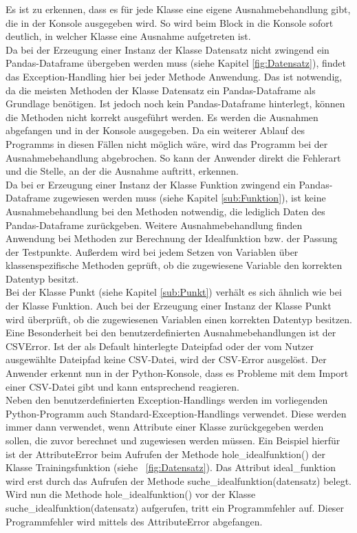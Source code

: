 \documentclass[11pt,a4paper]{scrreprt}
\newcommand{\abbildung}[1]{\figurename\ \ref{#1}}
\begin{document}
Es ist zu erkennen, dass es für jede Klasse eine eigene Ausnahmebehandlung gibt, die in der Konsole ausgegeben wird. So wird beim Block in die Konsole sofort deutlich, in welcher Klasse eine Ausnahme aufgetreten ist.\\
Da bei der Erzeugung einer Instanz der Klasse Datensatz nicht zwingend ein Pandas-Dataframe übergeben werden muss (siehe Kapitel \ref{fig:Datensatz}), findet das Exception-Handling hier bei jeder Methode Anwendung. Das ist notwendig, da die meisten Methoden der Klasse Datensatz ein Pandas-Dataframe als Grundlage benötigen. Ist jedoch noch kein Pandas-Dataframe hinterlegt, können die Methoden nicht korrekt ausgeführt werden. Es werden die Ausnahmen abgefangen und in der Konsole ausgegeben. Da ein weiterer Ablauf des Programms in diesen Fällen nicht möglich wäre, wird das Programm bei der Ausnahmebehandlung abgebrochen. So kann der Anwender direkt die Fehlerart und die Stelle, an der die Ausnahme auftritt, erkennen.\\
Da bei er Erzeugung einer Instanz der Klasse Funktion zwingend ein Pandas-Dataframe zugewiesen werden muss (siehe Kapitel \ref{sub:Funktion}), ist keine Ausnahmebehandlung bei den Methoden notwendig, die lediglich Daten des Pandas-Dataframe zurückgeben. 
Weitere Ausnahmebehandlung finden Anwendung bei Methoden zur Berechnung der Idealfunktion bzw. der Passung der Testpunkte. Außerdem wird bei jedem Setzen von Variablen über klassenspezifische Methoden geprüft, ob die zugewiesene Variable den korrekten Datentyp besitzt.  \\
Bei der Klasse Punkt (siehe Kapitel \ref{sub:Punkt}) verhält es sich ähnlich wie bei der Klasse Funktion. Auch bei der Erzeugung einer Instanz der Klasse Punkt wird überprüft, ob die zugewiesenen Variablen einen korrekten Datentyp besitzen. \\
Eine Besonderheit bei den benutzerdefinierten Ausnahmebehandlungen ist der CSVError. Ist der als Default hinterlegte Dateipfad oder der vom Nutzer ausgewählte Dateipfad keine CSV-Datei, wird der CSV-Error ausgelöst. Der Anwender erkennt nun in der Python-Konsole, dass es Probleme mit dem Import einer CSV-Datei gibt und kann entsprechend reagieren.\\
Neben den benutzerdefinierten Exception-Handlings werden im vorliegenden Python-Programm auch Standard-Exception-Handlings verwendet. Diese werden immer dann verwendet, wenn Attribute einer Klasse zurückgegeben werden sollen, die zuvor berechnet und zugewiesen werden müssen. Ein Beispiel hierfür ist der AttributeError beim Aufrufen der Methode hole\_idealfunktion() der Klasse Trainingsfunktion (siehe \abbildung{fig:Datensatz}). Das Attribut ideal\_funktion wird erst durch das Aufrufen der Methode suche\_idealfunktion(datensatz) belegt. Wird nun die Methode hole\_idealfunktion() vor der Klasse suche\_idealfunktion(datensatz) aufgerufen, tritt ein Programmfehler auf. Dieser Programmfehler wird mittels des AttributeError abgefangen.
\end{document}
